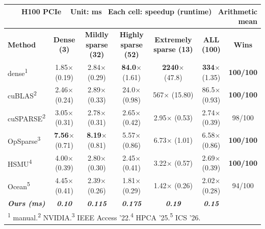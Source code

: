 
\begin{table}[t]
\centering
\setlength{\tabcolsep}{4pt}
\renewcommand{\arraystretch}{1.2}
\begin{tabular}{l c c c c c c}
\multicolumn{7}{r}{\hfill \footnotesize\color{gray} \textbf{H100 PCIe} \,\,\, \textbf{Unit}: ms\,\,\, \textbf{Each cell}: speedup (runtime)\,\,\, \textbf{Arithmetic} mean}\\
\hline\hline
\textbf{Method} & \textbf{Dense (3)} & \textbf{Mildly sparse (32)} & \textbf{Highly sparse (52)} & \textbf{Extremely sparse (13)} & \textbf{ALL (100)} & \textbf{Wins}\\
\hline
dense\textsuperscript{1} & 1.85$\times$ {\small\color{gray}(0.19)} & 2.84$\times$ {\small\color{gray}(0.29)} & \textbf{84.0$\times$} {\small\color{gray}(1.61)} & \textbf{2240$\times$} {\small\color{gray}(47.8)} & \textbf{334$\times$} {\small\color{gray}(1.35)} & \textbf{100/100} \\
cuBLAS\textsuperscript{2} & 2.46$\times$ {\small\color{gray}(0.24)} & 2.89$\times$ {\small\color{gray}(0.33)} & 24.0$\times$ {\small\color{gray}(0.98)} & 567$\times$ {\small\color{gray}(15.80)} & 86.5$\times$ {\small\color{gray}(0.93)} & \textbf{100/100} \\
cuSPARSE\textsuperscript{2} & 3.05$\times$ {\small\color{gray}(0.31)} & 2.78$\times$ {\small\color{gray}(0.31)} & 2.65$\times$ {\small\color{gray}(0.42)} & 2.95$\times$ {\small\color{gray}(0.53)} & 2.74$\times$ {\small\color{gray}(0.39)} & 98/100 \\
OpSparse\textsuperscript{3} & \textbf{7.56$\times$} {\small\color{gray}(0.71)} & \textbf{8.19$\times$} {\small\color{gray}(0.81)} & 5.57$\times$ {\small\color{gray}(0.86)} & 6.73$\times$ {\small\color{gray}(1.01)} & 6.58$\times$ {\small\color{gray}(0.86)} & \textbf{100/100} \\
HSMU\textsuperscript{4} & 4.00$\times$ {\small\color{gray}(0.39)} & 2.80$\times$ {\small\color{gray}(0.30)} & 2.45$\times$ {\small\color{gray}(0.41)} & 3.22$\times$ {\small\color{gray}(0.57)} & 2.69$\times$ {\small\color{gray}(0.39)} & \textbf{100/100} \\
Ocean\textsuperscript{5} & 4.45$\times$ {\small\color{gray}(0.41)} & 2.39$\times$ {\small\color{gray}(0.26)} & 1.81$\times$ {\small\color{gray}(0.29)} & 1.42$\times$ {\small\color{gray}(0.26)} & 2.02$\times$ {\small\color{gray}(0.28)} & 94/100 \\
\textbf{\textit{Ours (ms)}} & \textbf{\textit{0.10}} & \textbf{\textit{0.115}} & \textbf{\textit{0.175}} & \textbf{\textit{0.19}} & \textbf{\textit{0.15}} &  \\
\hline\hline
\multicolumn{7}{l}{\footnotesize\color{gray} \textsuperscript{1} manual.\quad \textsuperscript{2} NVIDIA.\quad \textsuperscript{3} IEEE Access '22.\quad \textsuperscript{4} HPCA '25.\quad \textsuperscript{5} ICS '26.}
\end{tabular}
\end{table}


